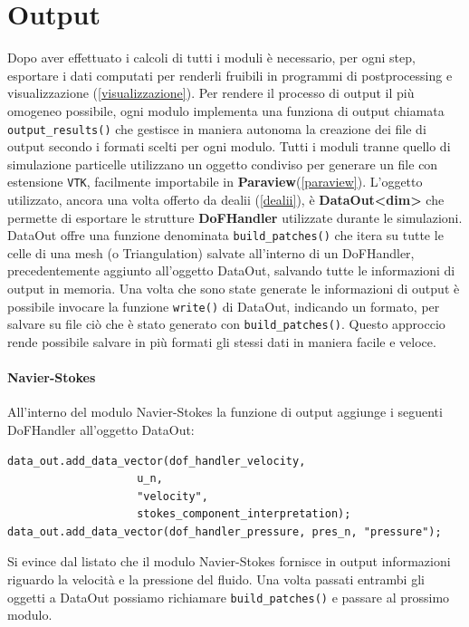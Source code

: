     \section{Output}\label{5:output}
    Dopo aver effettuato i calcoli di tutti i moduli è necessario, per ogni step, esportare i dati computati per renderli fruibili in programmi di postprocessing e visualizzazione (\ref*{visualizzazione}).
    Per rendere il processo di output il più omogeneo possibile, ogni modulo implementa una funziona di output chiamata \texttt{output\_results()} che gestisce in maniera autonoma la creazione dei file di output
    secondo i formati scelti per ogni modulo.
    Tutti i moduli tranne quello di simulazione particelle utilizzano un oggetto condiviso per generare un file con estensione \texttt{VTK}, facilmente importabile in \textbf{Paraview}(\ref*{paraview}).
    L'oggetto utilizzato, ancora una volta offerto da dealii (\ref*{dealii}), è \textbf{DataOut<dim>} che permette di esportare le strutture \textbf{DoFHandler} utilizzate durante le simulazioni.
    DataOut offre una funzione denominata \texttt{build\_patches()} che itera su tutte le celle di una mesh (o Triangulation) salvate all'interno di un DoFHandler, precedentemente aggiunto all'oggetto
    DataOut, salvando tutte le informazioni di output in memoria. Una volta che sono state generate le informazioni di output è possibile invocare la funzione \texttt{write()} di DataOut, indicando un formato,
    per salvare su file ciò che è stato generato con \texttt{build\_patches()}. Questo approccio rende possibile salvare in più formati gli stessi dati in maniera facile e veloce.

    \paragraph{Navier-Stokes}
    All'interno del modulo Navier-Stokes la funzione di output aggiunge i seguenti DoFHandler all'oggetto DataOut:
    \begin{verbatim}
data_out.add_data_vector(dof_handler_velocity,
                    u_n,
                    "velocity",
                    stokes_component_interpretation);
data_out.add_data_vector(dof_handler_pressure, pres_n, "pressure");
    \end{verbatim}
    Si evince dal listato che il modulo Navier-Stokes fornisce in output informazioni riguardo la velocità e la pressione del fluido.
    Una volta passati entrambi gli oggetti a DataOut possiamo richiamare \texttt{build\_patches()} e passare al prossimo modulo.

